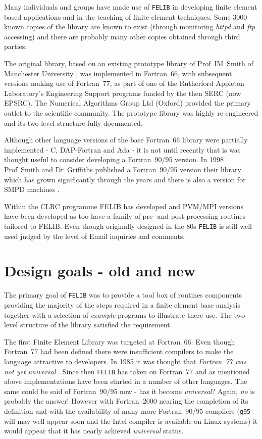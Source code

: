 \documentclass[a4paper,titlepage,11pt]{article}
\begin{document}
Many individuals and groups have made use of {\tt FELIB} in developing
finite element based applications and in the teaching of finite
element techniques. Some 3000 known copies of the library are known
to exist (through monitoring \textit{httpd} and \textit{ftp} accessing) and there are
probably many other copies obtained through third parties.

The original library, based on an existing prototype library of Prof~IM~Smith of
Manchester University \cite{imsmith1}, was implemented in Fortran~66, with 
subsequent versions making use of Fortran~77, as part of one of the Rutherford 
Appleton Laboratory's Engineering Support programs funded by the then SERC 
(now EPSRC). The Numerical Algorithms Group Ltd (Oxford) provided the primary 
outlet to the scientific community. The prototype library was highly re-engineered
and its two-level structure fully documented.

Although other language versions of the base Fortran~66 library were partially 
implemented - C, DAP-Fortran and Ada - it is not until recently that is was 
thought useful to consider developing a Fortran~90/95 version. In 1998 Prof~Smith
and Dr~Griffiths \cite{imsmith2} published a Fortran~90/95 version their library which has
grown significantly through the years and there is also a version for SMPD machines \cite{imsmith3}.

Within the CLRC programme FELIB has developed and PVM/MPI versions have been developed \cite{felib4}
as too have a family of pre- and post processing routines tailored to FELIB.
Even though originally designed in the 80s {\tt FELIB} is still well used judged
by the level of Email inquiries and comments.

\section{Design goals - old and new}
\label{design}
The primary goal of {\tt FELIB} was to provide a tool box of routines components
providing the majority of the steps required in a finite element base
analysis together with a selection of \textit{example}  programs to illustrate
there use. The two-level structure of the library satisfied the requirement.

The first Finite Element Library was targeted at Fortran~66. Even
though Fortran~77 had been defined there were insufficient compilers to make
the language attractive to developers. In 1985 it was thought that \textit{
Fortran~77 was not yet universal} \cite{felib3}. Since then {\tt FELIB} has taken
on Fortran~77 and as mentioned above implementations have been started in
a number of other languages. The same could be said of Fortran~90/95 now - has
it become \textit{universal}? Again, {\it no} is probably the answer! However with Fortran~2000
nearing the completion of its definition and with the availability of many more
Fortran~90/95 compilers ({\tt g95} will may well appear soon and the Intel compiler is
available on Linux systems) it would appear that it has nearly achieved {\it universal} status.
\end{document}
